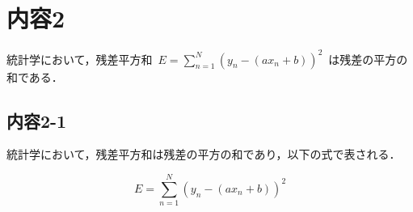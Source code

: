 
\section{内容2}
統計学において，残差平方和 $E = \sum_{n=1}^N (y_n-(ax_n+b))^2$ は残差の平方の和である．

\subsection{内容2-1}

統計学において，残差平方和は残差の平方の和であり，以下の式で表される．

\begin{equation}
    E = \sum_{n=1}^N (y_n-(ax_n+b))^2
\end{equation}

